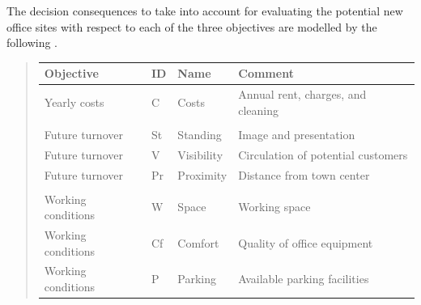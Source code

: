 \documentclass[a4paper,12pt,english]{sphinxhowto}
\begin{document}
The decision consequences to take into account for evaluating the potential new office sites with respect to each of the three objectives are modelled by the following .
\begin{quote}


\begin{savenotes}\sphinxattablestart
\centering
\begin{tabulary}{\linewidth}[t]{|T|T|T|T|}
\hline
\sphinxstyletheadfamily 
Objective
&\sphinxstyletheadfamily 
ID
&\sphinxstyletheadfamily 
Name
&\sphinxstyletheadfamily 
Comment
\\
\hline
Yearly costs
&
C
&
Costs
&
Annual rent, charges, and cleaning
\\
\hline

&

&

&

\\
\hline
Future turnover
&
St
&
Standing
&
Image and presentation
\\
\hline
Future turnover
&
V
&
Visibility
&
Circulation of potential customers
\\
\hline
Future turnover
&
Pr
&
Proximity
&
Distance from town center
\\
\hline

&

&

&

\\
\hline
Working conditions
&
W
&
Space
&
Working space
\\
\hline
Working conditions
&
Cf
&
Comfort
&
Quality of office equipment
\\
\hline
Working conditions
&
P
&
Parking
&
Available parking facilities
\\
\hline
\end{tabulary}
\par
\sphinxattableend\end{savenotes}
\end{quote}
\end{document}
